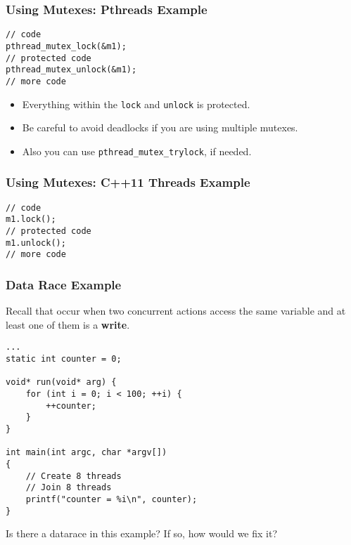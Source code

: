 \documentclass[aspectratio=43]{beamer}
\newenvironment{changemargin}[1]{%
  \begin{list}{}{%
    \setlength{\topsep}{0pt}%
    \setlength{\leftmargin}{#1}%
    \setlength{\rightmargin}{1em}
    \setlength{\listparindent}{\parindent}%
    \setlength{\itemindent}{\parindent}%
    \setlength{\parsep}{\parskip}%
  }%
  \item[]}{\end{list}}
\begin{document}
\begin{frame}[fragile]
  \frametitle{Using Mutexes: Pthreads Example}

\begin{changemargin}{1.5cm}
  \begin{lstlisting}
// code
pthread_mutex_lock(&m1);
// protected code
pthread_mutex_unlock(&m1);
// more code
  \end{lstlisting}
  \vfill
  \begin{itemize}
    \item Everything within the {\tt lock} and {\tt unlock} is protected.
    \item Be careful to avoid deadlocks if you are using multiple mutexes.
    \item Also you can use {\tt pthread\_mutex\_trylock}, if needed.
  \end{itemize}
\end{changemargin}
\end{frame}

\begin{frame}[fragile]
  \frametitle{Using Mutexes: C++11 Threads Example}

\begin{changemargin}{1.5cm}
  \begin{lstlisting}
// code
m1.lock(); 
// protected code
m1.unlock();
// more code
  \end{lstlisting}
\end{changemargin}
\end{frame}


\begin{frame}[fragile]
  \frametitle{Data Race Example}

\begin{changemargin}{1.5cm}
  Recall that  occur when two concurrent actions access the same
  variable and at least one of them is a {\bf write}.


  \begin{lstlisting}
...
static int counter = 0;

void* run(void* arg) {
    for (int i = 0; i < 100; ++i) {
        ++counter;
    }
}

int main(int argc, char *argv[])
{
    // Create 8 threads
    // Join 8 threads
    printf("counter = %i\n", counter);
}
  \end{lstlisting}

Is there a datarace in this example? If so, how would we fix it?
\end{changemargin}

\end{frame}
\end{document}
